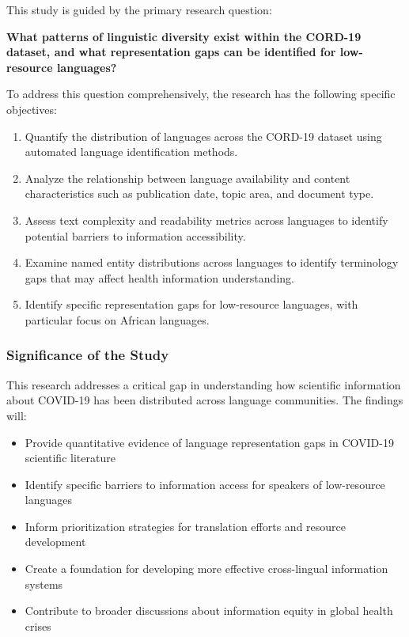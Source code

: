 \documentclass[
]{article}
\providecommand{\tightlist}{%
  \setlength{\itemsep}{0pt}\setlength{\parskip}{0pt}}\usepackage{longtable,booktabs,array}
\begin{document}
This study is guided by the primary research question:

\textbf{What patterns of linguistic diversity exist within the CORD-19
dataset, and what representation gaps can be identified for low-resource
languages?}

To address this question comprehensively, the research has the following
specific objectives:

\begin{enumerate}
\def\labelenumi{\arabic{enumi}.}
\item
  Quantify the distribution of languages across the CORD-19 dataset
  using automated language identification methods.
\item
  Analyze the relationship between language availability and content
  characteristics such as publication date, topic area, and document
  type.
\item
  Assess text complexity and readability metrics across languages to
  identify potential barriers to information accessibility.
\item
  Examine named entity distributions across languages to identify
  terminology gaps that may affect health information understanding.
\item
  Identify specific representation gaps for low-resource languages, with
  particular focus on African languages.
\end{enumerate}

\subsubsection{Significance of the
Study}\label{significance-of-the-study}

This research addresses a critical gap in understanding how scientific
information about COVID-19 has been distributed across language
communities. The findings will:

\begin{itemize}
\tightlist
\item
  Provide quantitative evidence of language representation gaps in
  COVID-19 scientific literature
\item
  Identify specific barriers to information access for speakers of
  low-resource languages
\item
  Inform prioritization strategies for translation efforts and resource
  development
\item
  Create a foundation for developing more effective cross-lingual
  information systems
\item
  Contribute to broader discussions about information equity in global
  health crises
\end{itemize}
\end{document}
